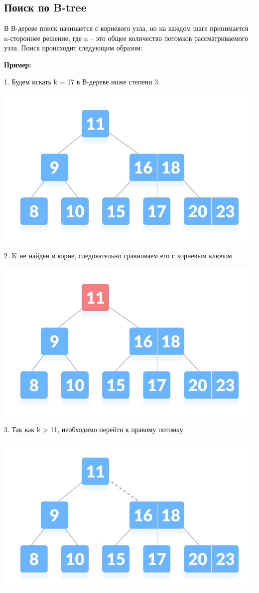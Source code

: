         \subsection{Поиск по B-tree}
        В В-дереве поиск начинается с корневого узла, но на каждом шаге принимается n-стороннее решение, где n – это общее количество потомков рассматриваемого узла. Поиск происходит следующим образом:\par
        
        \newpage
        \textbf{Пример:} \par
        1.	Будем искать k = 17 в В-дереве ниже степени 3. \par
        \includegraphics[width=0.6\linewidth]{search-1.jpg} \par
        2.	K не найден в корне, следовательно сравниваем его с корневым ключом \par
        \includegraphics[width=0.6\linewidth]{search-2.jpg} \par
        3.	Так как k > 11, необходимо перейти к правому потомку \par
        \includegraphics[width=0.6\linewidth]{search-3.jpg} \par
